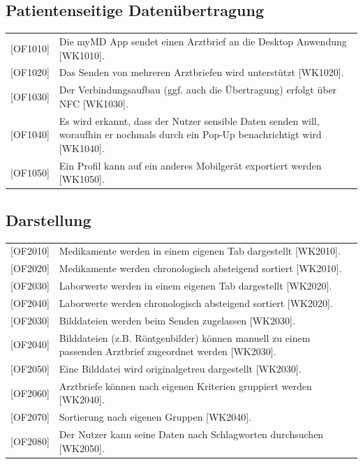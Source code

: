 \documentclass[a4paper]{scrreprt}
\begin{document}
\subsection{Patientenseitige Datenübertragung}
\begin{tabular}{lll}
[OF1010]&  \multicolumn{2}{p{12cm}}{Die myMD \gls{App} sendet einen \gls{Arztbrief} an die \gls{Desktop Anwendung} [WK1010].}\\
{[OF1020]} &  \multicolumn{2}{p{12cm}}{Das Senden von mehreren Arztbriefen wird unterstützt [WK1020].}  \\
{[OF1030]} &  \multicolumn{2}{p{12cm}}{Der Verbindungsaufbau (ggf. auch die Übertragung) erfolgt über \gls{NFC} [WK1030].}  \\
{[OF1040]} &  \multicolumn{2}{p{12cm}}{Es wird erkannt, dass der \gls{Nutzer} sensible Daten senden will, woraufhin er nochmals durch ein \gls{Pop-Up} benachrichtigt wird [WK1040].}  \\
{[OF1050]} &  \multicolumn{2}{p{12cm}}{Ein Profil kann auf ein anderes Mobilgerät exportiert werden [WK1050].}  \\

\end{tabular}

\subsection{Darstellung}
\begin{tabular}{lll}
[OF2010]&  \multicolumn{2}{p{12cm}}{\gls{Medikament}e werden in einem eigenen \gls{Tab} dargestellt [WK2010].}\\
{[OF2020]}&  \multicolumn{2}{p{12cm}}{\gls{Medikament}e werden chronologisch absteigend sortiert [WK2010].}\\
{[OF2030]}&  \multicolumn{2}{p{12cm}}{Laborwerte werden in einem eigenen \gls{Tab} dargestellt [WK2020].}\\
{[OF2040]}&  \multicolumn{2}{p{12cm}}{Laborwerte werden chronologisch absteigend sortiert [WK2020].}\\
{[OF2030]} &  \multicolumn{2}{p{12cm}}{Bilddateien werden beim Senden zugelassen [WK2030].}  \\
{[OF2040]} &  \multicolumn{2}{p{12cm}}{Bilddateien (z.B. Röntgenbilder) können manuell zu einem passenden \gls{Arztbrief} zugeordnet werden [WK2030].}  \\
{[OF2050]} &  \multicolumn{2}{p{12cm}}{Eine Bilddatei wird originalgetreu dargestellt [WK2030].}  \\
{[OF2060]} &  \multicolumn{2}{p{12cm}}{Arztbriefe können nach eigenen Kriterien gruppiert werden [WK2040].}  \\
{[OF2070]} &  \multicolumn{2}{p{12cm}}{Sortierung nach eigenen Gruppen [WK2040].}  \\
{[OF2080]} &  \multicolumn{2}{p{12cm}}{Der \gls{Nutzer} kann seine Daten nach Schlagworten durchsuchen [WK2050].}  \\

\end{tabular}
\end{document}
